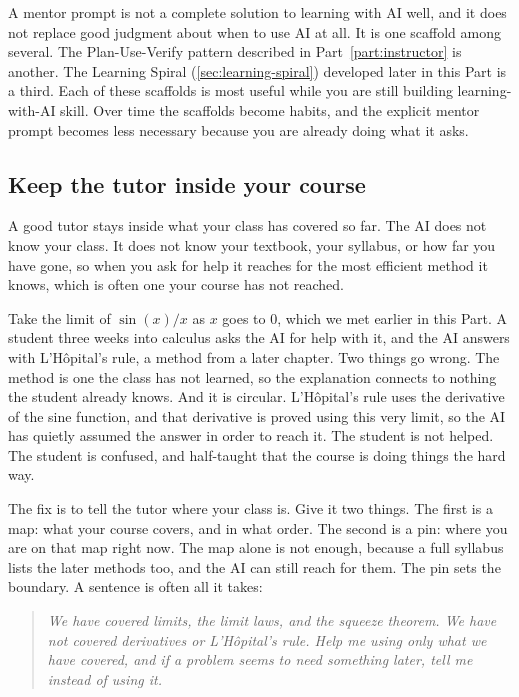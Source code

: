 \documentclass{SIAMbook2023}
\newcommand{\studentprompt}[1]{\begin{quote}\small\itshape #1\end{quote}}
\begin{document}
A mentor prompt is not a complete solution to learning with AI well, and it does not replace good judgment about when to use AI at all. It is one scaffold among several. The Plan-Use-Verify pattern described in Part~\ref{part:instructor} is another. The Learning Spiral (\cref{sec:learning-spiral}) developed later in this Part is a third. Each of these scaffolds is most useful while you are still building learning-with-AI skill. Over time the scaffolds become habits, and the explicit mentor prompt becomes less necessary because you are already doing what it asks.

\subsection{Keep the tutor inside your course}
\label{subsec:tutor-scope}%

A good tutor stays inside what your class has covered so far. The AI does not know your class. It does not know your textbook, your syllabus, or how far you have gone, so when you ask for help it reaches for the most efficient method it knows, which is often one your course has not reached.

Take the limit of $\sin(x)/x$ as $x$ goes to $0$, which we met earlier in this Part. A student three weeks into calculus asks the AI for help with it, and the AI answers with L'H\^{o}pital's rule, a method from a later chapter. Two things go wrong. The method is one the class has not learned, so the explanation connects to nothing the student already knows. And it is circular. L'H\^{o}pital's rule uses the derivative of the sine function, and that derivative is proved using this very limit, so the AI has quietly assumed the answer in order to reach it. The student is not helped. The student is confused, and half-taught that the course is doing things the hard way.

The fix is to tell the tutor where your class is. Give it two things. The first is a map: what your course covers, and in what order. The second is a pin: where you are on that map right now. The map alone is not enough, because a full syllabus lists the later methods too, and the AI can still reach for them. The pin sets the boundary. A sentence is often all it takes:

\studentprompt{We have covered limits, the limit laws, and the squeeze theorem. We have not covered derivatives or L'H\^{o}pital's rule. Help me using only what we have covered, and if a problem seems to need something later, tell me instead of using it.}
\end{document}
